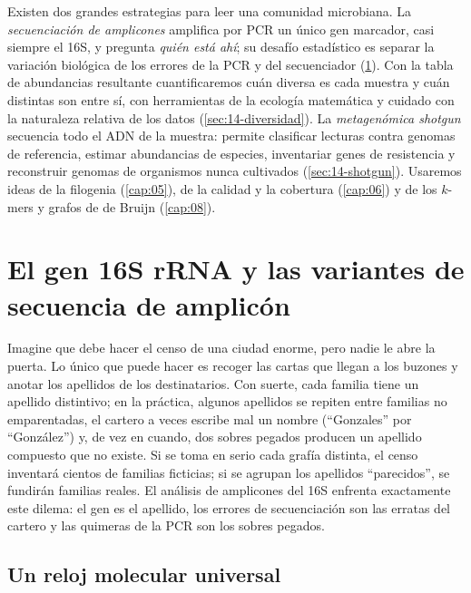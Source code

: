 Existen dos grandes estrategias para leer una comunidad microbiana. La \emph{secuenciación de amplicones} amplifica por PCR un único gen marcador, casi siempre el 16S, y pregunta \emph{quién está ahí}; su desafío estadístico es separar la variación biológica de los errores de la PCR y del secuenciador (\cref{sec:14-16s}). Con la tabla de abundancias resultante cuantificaremos cuán diversa es cada muestra y cuán distintas son entre sí, con herramientas de la ecología matemática y cuidado con la naturaleza relativa de los datos (\cref{sec:14-diversidad}). La \emph{metagenómica shotgun} secuencia todo el ADN de la muestra: permite clasificar lecturas contra genomas de referencia, estimar abundancias de especies, inventariar genes de resistencia y reconstruir genomas de organismos nunca cultivados (\cref{sec:14-shotgun}). Usaremos ideas de la filogenia (\cref{cap:05}), de la calidad y la cobertura (\cref{cap:06}) y de los $k$-mers y grafos de de Bruijn (\cref{cap:08}).

\section{El gen 16S rRNA y las variantes de secuencia de amplicón}\label{sec:14-16s}

\begin{intuicion}
Imagine que debe hacer el censo de una ciudad enorme, pero nadie le abre la puerta. Lo único que puede hacer es recoger las cartas que llegan a los buzones y anotar los apellidos de los destinatarios. Con suerte, cada familia tiene un apellido distintivo; en la práctica, algunos apellidos se repiten entre familias no emparentadas, el cartero a veces escribe mal un nombre (``Gonzales'' por ``González'') y, de vez en cuando, dos sobres pegados producen un apellido compuesto que no existe. Si se toma en serio cada grafía distinta, el censo inventará cientos de familias ficticias; si se agrupan los apellidos ``parecidos'', se fundirán familias reales. El análisis de amplicones del 16S enfrenta exactamente este dilema: el gen es el apellido, los errores de secuenciación son las erratas del cartero y las quimeras de la PCR son los sobres pegados.
\end{intuicion}

\subsection{Un reloj molecular universal}

